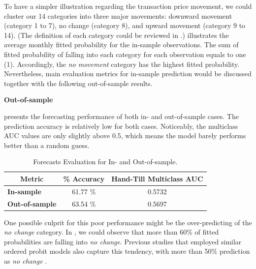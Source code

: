 To have a simpler illustration regarding the transaction price movement, we could cluster our 14 categories into three major movements: downward movement (category 1 to 7), no change (category 8), and upward movement (category 9 to 14). (The definition of each category could be reviewed in .)  illustrates the average monthly fitted probability for the in-sample observations. The sum of fitted probability of falling into each category for each observation equals to one (1). Accordingly, the \textit{no movement} category has the highest fitted probability. Nevertheless, main evaluation metrics for in-sample prediction would be discussed together with the following out-of-sample results.




{\noindent\bfseries Out-of-sample }

 presents the forecasting performance of both in- and out-of-sample cases. The prediction accuracy is relatively low for both cases. Noticeably, the multiclass AUC values are only slightly above 0.5, which means the model barely performs better than a random guess. 



\begin{table}[H]
\centering
\begin{tabular}{@{}lcc@{}}
\toprule
\multicolumn{1}{c}{Metric} & \multicolumn{1}{l}{\textbf{\% Accuracy}} & \multicolumn{1}{l}{\textbf{Hand-Till Multiclass AUC}} \\ \midrule
\textbf{In-sample}         & 61.77 \%                                 & 0.5732                                                \\
\textbf{Out-of-sample}     & 63.54 \%                                 & 0.5697                                                \\ \bottomrule
\end{tabular}
\caption{Forecasts Evaluation for In- and Out-of-sample.}
\label{tab:table-11}
\end{table}


One possible culprit for this poor performance might be the over-predicting of the \textit{no change} category. In , we could observe that more than 60\% of fitted probabilities are falling into \textit{no change}. Previous studies that employed similar ordered probit models also capture this tendency, with more than 50\% prediction as \textit{no change} \citep{yangparwada2012, kim2014}. 


